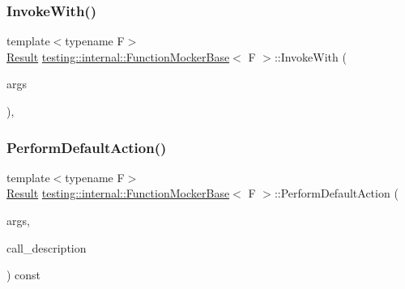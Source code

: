 \mbox{\label{classtesting_1_1internal_1_1_function_mocker_base_a869ec713f000b4e7829c660efc25e8cd}} 
\subsubsection{\texorpdfstring{Invoke\+With()}{InvokeWith()}}
{\footnotesize\ttfamily template$<$typename F$>$ \\
\hyperlink{classtesting_1_1internal_1_1_function_mocker_base_aa50abc4055b4d3a14ad64c317bccec8d}{Result} \hyperlink{classtesting_1_1internal_1_1_function_mocker_base}{testing\+::internal\+::\+Function\+Mocker\+Base}$<$ F $>$\+::Invoke\+With (\begin{DoxyParamCaption}\item[{const \hyperlink{classtesting_1_1internal_1_1_function_mocker_base_a336432a07e544af4ffb8103603471ca3}{Argument\+Tuple} \&}]{args }\end{DoxyParamCaption})\hspace{0.3cm}{\ttfamily [inline]}, {\ttfamily [protected]}}

\mbox{\label{classtesting_1_1internal_1_1_function_mocker_base_adbef6e1af840c9c14c3a6acee01007b2}} 
\subsubsection{\texorpdfstring{Perform\+Default\+Action()}{PerformDefaultAction()}}
{\footnotesize\ttfamily template$<$typename F$>$ \\
\hyperlink{classtesting_1_1internal_1_1_function_mocker_base_aa50abc4055b4d3a14ad64c317bccec8d}{Result} \hyperlink{classtesting_1_1internal_1_1_function_mocker_base}{testing\+::internal\+::\+Function\+Mocker\+Base}$<$ F $>$\+::Perform\+Default\+Action (\begin{DoxyParamCaption}\item[{const \hyperlink{classtesting_1_1internal_1_1_function_mocker_base_a336432a07e544af4ffb8103603471ca3}{Argument\+Tuple} \&}]{args,  }\item[{const \hyperlink{namespacetesting_1_1internal_a8e8ff5b11e64078831112677156cb111}{string} \&}]{call\+\_\+description }\end{DoxyParamCaption}) const\hspace{0.3cm}{\ttfamily [inline]}}

